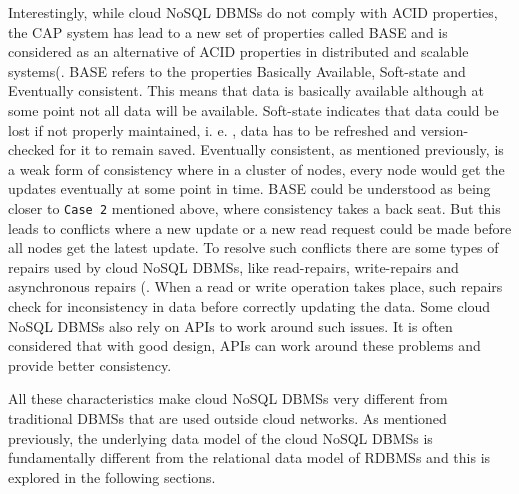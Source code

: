 Interestingly,   while cloud \ac{NoSQL} \acp{DBMS} do not comply with ACID
properties,   the CAP system has lead to a new set of properties called BASE and
is considered as an alternative of ACID properties in distributed and scalable
systems(.
BASE refers to the properties Basically Available,   Soft-state and Eventually
consistent.  This means that data is basically available although at some point
not all data will be available.  Soft-state indicates that data could be lost if
not properly maintained,   i. e. ,   data has to be refreshed and
version-checked for it to remain saved.  Eventually consistent,   as mentioned
previously,   is a weak form of consistency where in a cluster of nodes,   every
node would get the updates eventually at some point in time.
BASE could be understood as being closer to  \texttt{Case 2} mentioned above,
where consistency takes a back seat.  But this leads to conflicts where a new
update or a new read request could be made before all nodes get the latest
update.  To resolve such conflicts there are some types of repairs used by cloud
\ac{NoSQL} \acp{DBMS}, like read-repairs,   write-repairs and asynchronous
repairs (.
When a read or write operation takes place,   such repairs check for
inconsistency in data before correctly updating the data.  Some cloud \ac{NoSQL}
\acp{DBMS} also rely on APIs to work around such issues.  It is often considered
that with good design,   \acp{API} can work around these problems and provide
better consistency.

All these characteristics make cloud \ac{NoSQL} \acp{DBMS} very different from
traditional \acp{DBMS} that are used outside cloud networks.  As mentioned
previously, the underlying data model of the cloud \ac{NoSQL} \acp{DBMS} is
fundamentally different from the relational data model of \acp{RDBMS} and this
is explored in the following sections.
